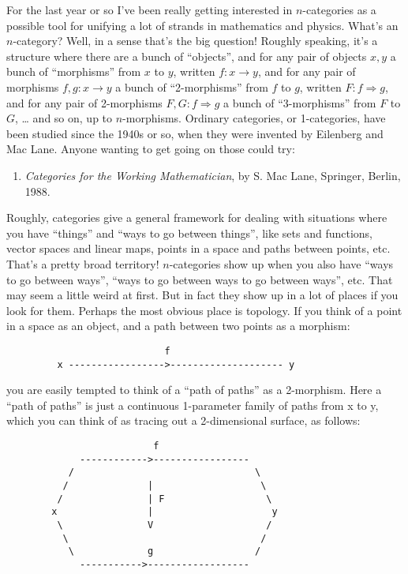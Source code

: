 \documentclass{article}
\def\tightlist{}
\begin{document}
For the last year or so I've been really getting interested in
\(n\)-categories as a possible tool for unifying a lot of strands in
mathematics and physics. What's an \(n\)-category? Well, in a sense
that's the big question! Roughly speaking, it's a structure where there
are a bunch of ``objects'', and for any pair of objects \(x,y\) a bunch
of ``morphisms'' from \(x\) to \(y\), written \(f\colon x \to y\), and
for any pair of morphisms \(f, g\colon x \to y\) a bunch of
``2-morphisms'' from \(f\) to \(g\), written
\(F\colon f \Rightarrow g\), and for any pair of 2-morphisms
\(F, G\colon f \Rightarrow g\) a bunch of ``3-morphisms'' from \(F\) to
\(G\), \ldots{} and so on, up to \(n\)-morphisms. Ordinary categories,
or 1-categories, have been studied since the 1940s or so, when they were
invented by Eilenberg and Mac Lane. Anyone wanting to get going on those
could try:

\begin{enumerate}
\def\labelenumi{\arabic{enumi})}
\tightlist
\item
  \emph{Categories for the Working Mathematician}, by S. Mac Lane,
  Springer, Berlin, 1988.
\end{enumerate}

Roughly, categories give a general framework for dealing with situations
where you have ``things'' and ``ways to go between things'', like sets
and functions, vector spaces and linear maps, points in a space and
paths between points, etc. That's a pretty broad territory!
\(n\)-categories show up when you also have ``ways to go between ways'',
``ways to go between ways to go between ways'', etc. That may seem a
little weird at first. But in fact they show up in a lot of places if
you look for them. Perhaps the most obvious place is topology. If you
think of a point in a space as an object, and a path between two points
as a morphism:

\begin{verbatim}
                            f
         x ----------------->-------------------- y
\end{verbatim}

you are easily tempted to think of a ``path of paths'' as a 2-morphism.
Here a ``path of paths'' is just a continuous 1-parameter family of
paths from x to y, which you can think of as tracing out a 2-dimensional
surface, as follows:

\begin{verbatim}
                          f
             ------------>-----------------
           /                                \
          /              |                   \
         /               | F                  \
        x                |                     y
         \               V                    /
          \                                  /
           \             g                  /
             ----------->------------------  
\end{verbatim}
\end{document}
